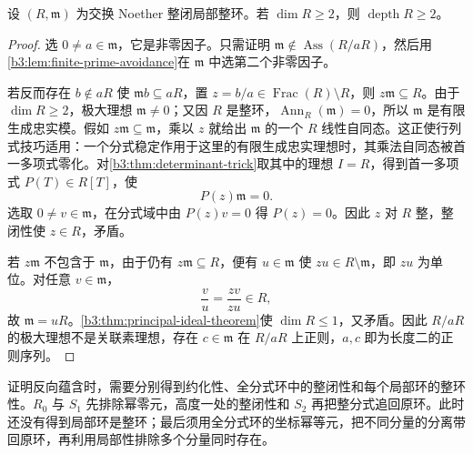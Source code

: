 \begin{lemma}\label{b3:lem:normal-local-depth-two}
	设 \((R,\mathfrak m)\) 为交换 Noether 整闭局部整环。若 \(\dim R\ge2\)，则 \(\operatorname{depth}R\ge2\)。
\end{lemma}
\begin{proof}
	选 \(0\ne a\in\mathfrak m\)，它是非零因子。只需证明 \(\mathfrak m\notin\operatorname{Ass}(R/aR)\)，然后用\cref{b3:lem:finite-prime-avoidance}在 \(\mathfrak m\) 中选第二个非零因子。

	若反而存在 \(b\notin aR\) 使 \(\mathfrak mb\subseteq aR\)，置 \(z=b/a\in\operatorname{Frac}(R)\setminus R\)，则 \(z\mathfrak m\subseteq R\)。由于 \(\dim R\ge2\)，极大理想 \(\mathfrak m\ne0\)；又因 \(R\) 是整环，\(\operatorname{Ann}_R(\mathfrak m)=0\)，所以 \(\mathfrak m\) 是有限生成忠实模。假如 \(z\mathfrak m\subseteq\mathfrak m\)，乘以 \(z\) 就给出 \(\mathfrak m\) 的一个 \(R\) 线性自同态。这正使行列式技巧适用：一个分式稳定作用于这里的有限生成忠实理想时，其乘法自同态被首一多项式零化。对\cref{b3:thm:determinant-trick}取其中的理想 \(I=R\)，得到首一多项式 \(P(T)\in R[T]\)，使
	\[
		P(z)\mathfrak m=0.
	\]
	选取 \(0\ne v\in\mathfrak m\)，在分式域中由 \(P(z)v=0\) 得 \(P(z)=0\)。因此 \(z\) 对 \(R\) 整，整闭性使 \(z\in R\)，矛盾。

	若 \(z\mathfrak m\) 不包含于 \(\mathfrak m\)，由于仍有 \(z\mathfrak m\subseteq R\)，便有 \(u\in\mathfrak m\) 使 \(zu\in R\setminus\mathfrak m\)，即 \(zu\) 为单位。对任意 \(v\in\mathfrak m\)，
	\[
		\frac vu=\frac{zv}{zu}\in R,
	\]
	故 \(\mathfrak m=uR\)。\cref{b3:thm:principal-ideal-theorem}使 \(\dim R\le1\)，又矛盾。因此 \(R/aR\) 的极大理想不是关联素理想，存在 \(c\in\mathfrak m\) 在 \(R/aR\) 上正则，\(a,c\) 即为长度二的正则序列。
\end{proof}

证明反向蕴含时，需要分别得到约化性、全分式环中的整闭性和每个局部环的整环性。\(R_0\) 与 \(S_1\) 先排除幂零元，高度一处的整闭性和 \(S_2\) 再把整分式追回原环。此时还没有得到局部环是整环；最后须用全分式环的坐标幂等元，把不同分量的分离带回原环，再利用局部性排除多个分量同时存在。

